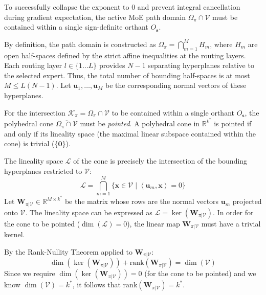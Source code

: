 \documentclass{article}
\newcommand{\R}{\mathbb{R}}
\newcommand{\1}{\mathbb{I}}
\newcommand{\inner}[2]{\left\langle#1, #2\right\rangle}
\newcommand{\bx}{\mathbf{x}}
\newcommand{\bu}{\mathbf{u}}
\newcommand{\bW}{\mathbf{W}}
\newcommand{\rank}{\mathrm{rank}}
\begin{document}
To successfully collapse the exponent to 0 and prevent integral cancellation during gradient expectation, the active MoE path domain $\Omega_\pi \cap \mathcal{V}$ must be contained within a single sign-definite orthant $O_{\boldsymbol{s}}$. 

By definition, the path domain is constructed as $\Omega_\pi = \bigcap_{m=1}^M H_m$, where $H_m$ are open half-spaces defined by the strict affine inequalities at the routing layers. Each routing layer $l \in \{1 \dots L\}$ provides $N-1$ separating hyperplanes relative to the selected expert. Thus, the total number of bounding half-spaces is at most $M \le L(N-1)$. Let $\bu_1, \dots, \bu_M$ be the corresponding normal vectors of these hyperplanes.

For the intersection $\mathcal{K}_\pi = \Omega_\pi \cap \mathcal{V}$ to be contained within a single orthant $O_{\boldsymbol{s}}$, the polyhedral cone $\overline{\Omega_\pi \cap \mathcal{V}}$ must be \textit{pointed}. A polyhedral cone in $\R^{k^*}$ is pointed if and only if its lineality space (the maximal linear subspace contained within the cone) is trivial ($\{\mathbf{0}\}$). 

The lineality space $\mathcal{L}$ of the cone is precisely the intersection of the bounding hyperplanes restricted to $\mathcal{V}$:
\begin{equation}
    \mathcal{L} = \bigcap_{m=1}^M \{ \bx \in \mathcal{V} \mid \inner{\bu_m}{\bx} = 0 \}
\end{equation}
Let $\bW_{\pi|\mathcal{V}} \in \R^{M \times k^*}$ be the matrix whose rows are the normal vectors $\bu_m$ projected onto $\mathcal{V}$. The lineality space can be expressed as $\mathcal{L} = \ker(\bW_{\pi|\mathcal{V}})$. In order for the cone to be pointed ($\dim(\mathcal{L}) = 0$), the linear map $\bW_{\pi|\mathcal{V}}$ must have a trivial kernel. 

By the Rank-Nullity Theorem applied to $\bW_{\pi|\mathcal{V}}$:
\begin{equation}
    \dim(\ker(\bW_{\pi|\mathcal{V}})) + \rank(\bW_{\pi|\mathcal{V}}) = \dim(\mathcal{V})
\end{equation}
Since we require $\dim(\ker(\bW_{\pi|\mathcal{V}})) = 0$ (for the cone to be pointed) and we know $\dim(\mathcal{V}) = k^*$, it follows that $\rank(\bW_{\pi|\mathcal{V}}) = k^*$.
\end{document}
